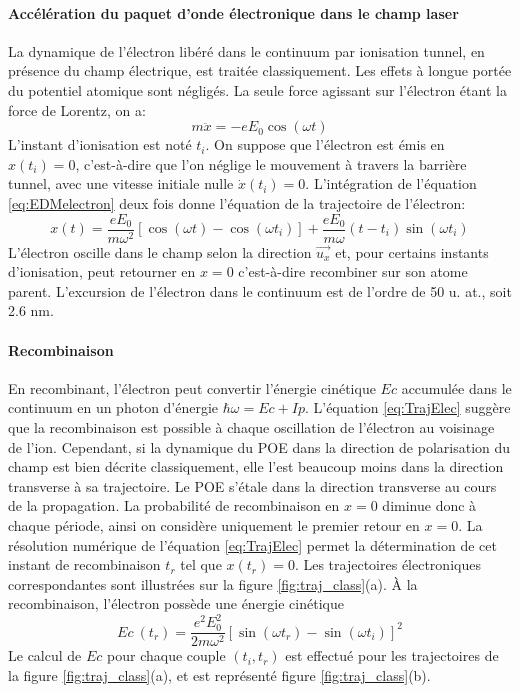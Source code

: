 \paragraph{Accélération du paquet d'onde électronique dans le champ laser} La dynamique de l'électron libéré dans le continuum par ionisation tunnel, en présence du champ électrique, est traitée classiquement. Les effets à longue portée du potentiel atomique sont négligés. La seule force agissant sur l'électron étant la force de Lorentz, on a:
\begin{equation}
m \ddot{x} = -e E_0 \cos(\omega t)
\label{eq:EDMelectron}
\end{equation} 
L'instant d'ionisation est noté $t_i$. On suppose que l'électron est émis en $x(t_i) = 0$, c'est-à-dire que l'on néglige le mouvement à travers la barrière tunnel, avec une vitesse initiale nulle $\dot{x}(t_i) = 0$. L'intégration de l'équation \ref{eq:EDMelectron} deux fois donne l'équation de la trajectoire de l'électron:
\begin{equation}
x(t) = \frac{e E_0}{m \omega^2} \left[ \cos(\omega t) - \cos(\omega t_i) \right] + \frac{e E_0}{m \omega}(t-t_i) \sin(\omega t_i)
\label{eq:TrajElec}
\end{equation}
L'électron oscille dans le champ selon la direction $\vec{u_x}$ et, pour certains instants d'ionisation, peut retourner en $x = 0$ c'est-à-dire recombiner sur son atome parent. L'excursion de l'électron dans le continuum est de l'ordre de 50 u. at., soit 2.6 nm.

\paragraph{Recombinaison} En recombinant, l'électron peut convertir l'énergie cinétique $Ec$ accumulée dans le continuum en un photon d'énergie $\hbar \omega = Ec + Ip$. L'équation \ref{eq:TrajElec} suggère que la recombinaison est possible à chaque oscillation de l'électron au voisinage de l'ion. Cependant, si la dynamique du POE dans la direction de polarisation du champ est bien décrite classiquement, elle l'est beaucoup moins dans la direction transverse à sa trajectoire. Le POE s'étale dans la direction transverse au cours de la propagation. La probabilité de recombinaison en $x = 0$ diminue donc à chaque période, ainsi on considère uniquement le premier retour en $x = 0$. La résolution numérique de l'équation \ref{eq:TrajElec} permet la détermination de cet instant de recombinaison $t_r$ tel que $x(t_r) = 0$. Les trajectoires électroniques correspondantes sont illustrées sur la figure \ref{fig:traj_class}(a). \`{A} la recombinaison, l'électron possède une énergie cinétique
\begin{equation}
Ec \: (t_r) = \frac{e^2 E_0^2}{2m\omega^2} \left[ \sin(\omega t_r) - \sin(\omega t_i) \right]^2
\end{equation}
Le calcul de $Ec$ pour chaque couple $(t_i, t_r)$ est effectué pour les trajectoires de la figure \ref{fig:traj_class}(a), et est représenté figure \ref{fig:traj_class}(b). 

